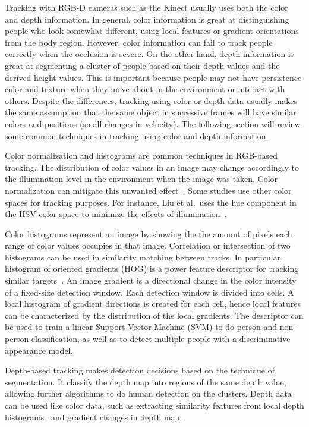Tracking with RGB-D cameras such as the Kinect usually uses both the color and depth information. In general, color information is great at distinguishing people who look somewhat different, using local features or gradient orientations from the body region. However, color information can fail to track people correctly when the occlusion is severe. On the other hand, depth information is great at segmenting a cluster of people based on their depth values and the derived height values. This is important because people may not have persistence color and texture when they move about in the environment or interact with others. Despite the differences, tracking using color or depth data usually makes the same assumption that the same object in successive frames will have similar colors and positions (small changes in velocity). The following section will review some common techniques in tracking using color and depth information.

Color normalization and histograms are common techniques in RGB-based tracking. The distribution of color values in an image may change accordingly to the illumination level in the environment when the image was taken. Color normalization can mitigate this unwanted effect~\cite{reinhard_color_transfers}. Some studies use other color spaces for tracking purposes. For instance, Liu et al.\ uses the hue component in the HSV color space to minimize the effects of illumination~\cite{liu_tracking_with_pei}.

Color histograms represent an image by showing the the amount of pixels each range of color values occupies in that image. Correlation or intersection of two histograms can be used in similarity matching between tracks. In particular, histogram of oriented gradients (HOG) is a power feature descriptor for tracking similar targets~\cite{dalal_hog, dollar_pedestrian_detection, munaro_tracking_within_groups_with_mobile_robot, luber_rgbd_boosted_models}. An image gradient is a directional change in the color intensity of a fixed-size detection window. Each detection window is divided into cells. A local histogram of gradient directions is created for each cell, hence local features can be characterized by the distribution of the local gradients. The descriptor can be used to train a linear Support Vector Machine (SVM) to do person and non-person classification, as well as to detect multiple people with a discriminative appearance model.

Depth-based tracking makes detection decisions based on the technique of segmentation. It classify the depth map into regions of the same depth value, allowing further algorithms to do human detection on the clusters. Depth data can be used like color data, such as extracting similarity features from local depth histograms~\cite{ikemura_depth_simialrity_features} and gradient changes in depth map~\cite{spinello_depth_gradients}.

